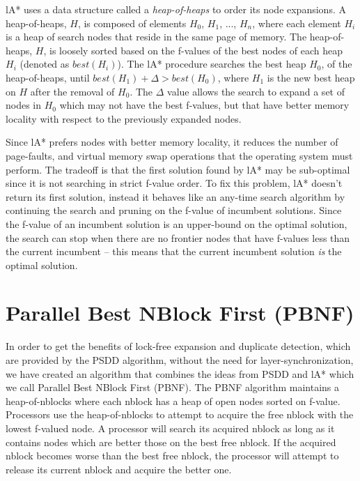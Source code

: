 \documentclass{article}
\begin{document}
lA* uses a data structure called a \emph{heap-of-heaps} to order its
node expansions.  A heap-of-heaps, $H$, is composed of elements $H_0$,
$H_1$, ..., $H_n$, where each element $H_i$ is a heap of search nodes
that reside in the same page of memory.  The heap-of-heaps, $H$, is
loosely sorted based on the f-values of the best nodes of each heap
$H_i$ (denoted as $best(H_i)$).  The lA* procedure searches the best
heap $H_0$, of the heap-of-heaps, until $best(H_1) + \Delta >
best(H_0)$, where $H_1$ is the new best heap on $H$ after the removal
of $H_0$.  The $\Delta$ value allows the search to expand a set of
nodes in $H_0$ which may not have the best f-values, but that have
better memory locality with respect to the previously expanded nodes.

Since lA* prefers nodes with better memory locality, it reduces the
number of page-faults, and virtual memory swap operations that the
operating system must perform.  The tradeoff is that the first
solution found by lA* may be sub-optimal since it is not searching in
strict f-value order.  To fix this problem, lA* doesn't return its
first solution, instead it behaves like an any-time search algorithm
by continuing the search and pruning on the f-value of incumbent
solutions.  Since the f-value of an incumbent solution is an
upper-bound on the optimal solution, the search can stop when there
are no frontier nodes that have f-values less than the current
incumbent -- this means that the current incumbent solution \emph{is}
the optimal solution.

\section{Parallel Best NBlock First (PBNF)}

In order to get the benefits of lock-free expansion and duplicate
detection, which are provided by the PSDD algorithm, without the need
for layer-synchronization, we have created an algorithm that combines
the ideas from PSDD and lA* which we call Parallel Best NBlock First
(PBNF).  The PBNF algorithm maintains a heap-of-nblocks where each
nblock has a heap of open nodes sorted on f-value.  Processors use the
heap-of-nblocks to attempt to acquire the free nblock with the lowest
f-valued node.  A processor will search its acquired nblock as long as
it contains nodes which are better those on the best free nblock.  If
the acquired nblock becomes worse than the best free nblock, the
processor will attempt to release its current nblock and acquire the
better one.
\end{document}
